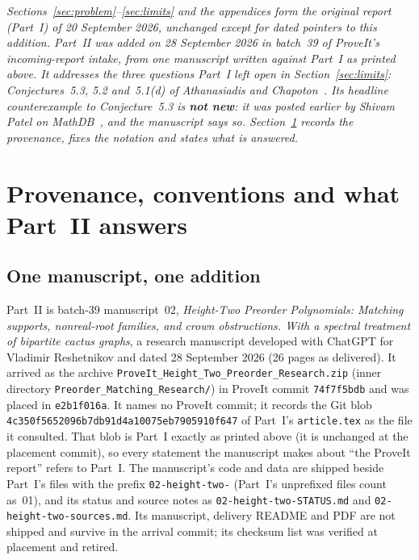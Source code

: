 \documentclass[11pt]{article}
\numberwithin{equation}{section}
\theoremstyle{definition}
\begin{document}
\noindent\emph{Sections~\ref{sec:problem}--\ref{sec:limits} and the
appendices form the original report (Part~I) of 20 September 2026,
unchanged except for dated pointers to this addition. Part~II was added on
28 September 2026 in batch~39 of ProveIt's incoming-report intake, from one
manuscript written against Part~I as printed above. It addresses the three
questions Part~I left open in Section~\ref{sec:limits}: Conjectures~5.3,
5.2 and~5.1(d) of Athanasiadis and Chapoton~\cite{AC}. Its headline
counterexample to Conjecture~5.3 is \textbf{not new}: it was posted earlier
by Shivam Patel on MathDB~\cite{Patel}, and the manuscript says so.
Section~\ref{htwo:sec:intro} records the provenance, fixes the notation and
states what is answered.}

\section{Provenance, conventions and what Part~II answers}
\label{htwo:sec:intro}

\subsection{One manuscript, one addition}
\label{htwo:sec:source}
Part~II is batch-39 manuscript~02, \emph{Height-Two Preorder Polynomials:
Matching supports, nonreal-root families, and crown obstructions. With a
spectral treatment of bipartite cactus graphs}, a research manuscript
developed with ChatGPT for Vladimir Reshetnikov and dated 28 September 2026
(26 pages as delivered). It arrived as the archive
\nolinkurl{ProveIt_Height_Two_Preorder_Research.zip} (inner directory
\nolinkurl{Preorder_Matching_Research/}) in ProveIt commit
\texttt{74f7f5bdb} and was placed in \texttt{e2b1f016a}. It names no ProveIt
commit; it records the Git blob
\texttt{4c350f5652096b7db91d\allowbreak 4a10075eb7905910f647} of Part~I's
\texttt{article.tex} as the file it consulted. That blob is Part~I exactly as
printed above (it is unchanged at the placement commit), so every statement
the manuscript makes about ``the ProveIt report'' refers to Part~I. The
manuscript's code and data are shipped beside Part~I's files with the prefix
\texttt{02-height-two-} (Part~I's unprefixed files count as~01), and its
status and source notes as \texttt{02-height-two-STATUS.md} and
\texttt{02-height-two-sources.md}. Its manuscript, delivery README and PDF are
not shipped and survive in the arrival commit; its checksum list was verified
at placement and retired.
\end{document}
